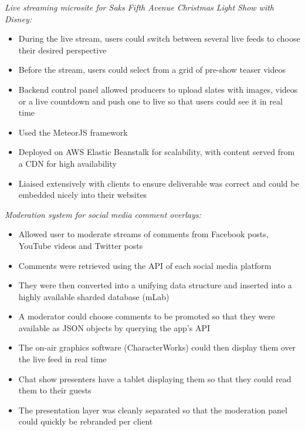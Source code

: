 \item \textit{Live streaming microsite for \emph{Saks Fifth Avenue Christmas Light Show with Disney}:}
    \begin{itemize}%
        \item During the live stream, users could switch between several live feeds to choose their desired perspective
        \item Before the stream, users could select from a grid of pre-show teaser videos
        \item Backend control panel allowed producers to upload slates with images, videos or a live countdown and push one to live so that users could see it in real time
        \item Used the MeteorJS framework
        \item Deployed on AWS Elastic Beanstalk for scalability, with content served from a CDN for high availability
        \item Liaised extensively with clients to ensure deliverable was correct and could be embedded nicely into their websites
    \end{itemize}
    \bigbreak
\item \textit{Moderation system for social media comment overlays:}
    \begin{itemize}
        \item Allowed user to moderate streams of comments from Facebook posts, YouTube videos and Twitter posts
        \item Comments were retrieved using the API of each social media platform
        \item They were then converted into a unifying data structure and inserted into a highly available sharded database (mLab)
        \item A moderator could choose comments to be promoted so that they were available as JSON objects by querying the app's API
        \item The on-air graphics software (CharacterWorks) could then display them over the live feed in real time
        \item Chat show presenters have a tablet displaying them so that they could read them to their guests
        \item The presentation layer was cleanly separated so that the moderation panel could quickly be rebranded per client
    \end{itemize}
    \bigbreak
